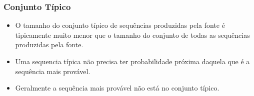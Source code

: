 \begin{frame}%
  \frametitle{Conjunto Típico}
  \begin{itemize}
  \item O tamanho do conjunto típico de sequências produzidas pela fonte é tipicamente
        muito menor que o tamanho do conjunto de todas as sequências produzidas pela fonte.
  \item Uma sequencia típica não precisa ter probabilidade próxima daquela que é a sequência mais provável.
  \item Geralmente a sequência mais provável não está no conjunto típico.
  \end{itemize}
\end{frame}



